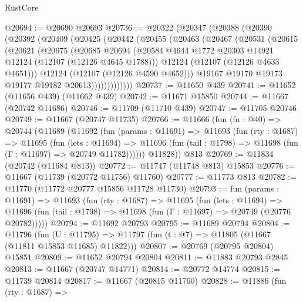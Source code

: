 \begin{lexlean}{RustCore}
\begin{coremodule}
@20694 := @20690 @20693
@20736 := @20322
    (@20347
      (@20388
        (@20390
          (@20392
            (@20409
              (@20425
                (@20442
                  (@20455
                    (@20463
                      (@20467
                        (@20531
                          (@20615
                            (@20621
                              (@20675
                                (@20685
                                  @20694
                                  (@20584
                                    @4644
                                    @1772
                                    @20303
                                    @14921
                                    @12124
                                    (@12107 (@12126 @4645 @1788)))
                                  @12124
                                  (@12107 (@12126 @4633 @4651)))
                                @12124
                                (@12107 (@12126 @4590 @4652)))
                              @19167
                              @19170
                              @19173
                              @19177
                              @19182
                              @20613)))))))))))))
@20737 := @11650 @439
@20741 := @11652 (@11656 @439) (@11662 @439)
@20742 := @11671 @15850
@20744 := @11667 (@20742 @11686)
@20746 := @11709 (@11710 @439)
@20747 := @11705 @20746
@20749 := @11667 (@20747 @11735)
@20766 := @11666
    (fun (fn : @40) =>
    @20744
      (@11689
        (@11692
          (fun (params : @11691) =>
          @11693
            (fun (rty : @1687) =>
            @11695
              (fun (lets : @11694) =>
              @11696 (fun (tail : @1798) => @11698 (fun (Γ : @11697) => @20749 @11782))))))
        @11828))
    @813
@20769 := @11834 (@20742 (@11684 @813))
@20772 := @11747 (@11748 @813) @15853
@20776 := @11667 (@11739 (@20772 @11756) @11760)
@20777 := @11773 @813
@20782 := @11770 (@11772 @20777 @15856 @11728 @11730)
@20793 := fun (params : @11691) =>
  @11693
    (fun (rty : @1687) =>
    @11695
      (fun (lets : @11694) =>
      @11696 (fun (tail : @1798) => @11698 (fun (Γ : @11697) => @20749 (@20776 @20782)))))
@20794 := @11692 @20793
@20795 := @11689 @20794
@20804 := @11796
    (fun (U : @11795) => @11797 (fun (t : @7) => @11805 (@11667 (@11811 @15853 @11685) @11822)))
@20807 := @20769 (@20795 @20804) @15851
@20809 := @11652 @20794 @20804
@20811 := @11883 @20793 @2845
@20813 := @11667 (@20747 @14771)
@20814 := @20772 @14774
@20815 := @11739 @20814
@20817 := @11667 (@20815 @11760)
@20828 := @11886
    (fun (rty : @1687) =>

\end{coremodule}
\end{lexlean}
